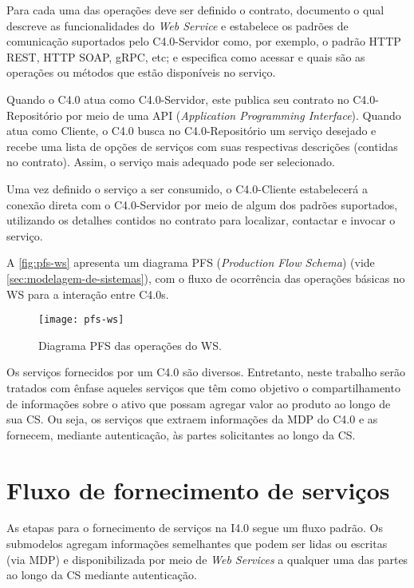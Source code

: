 Para cada uma das operações deve ser definido o contrato, documento o qual descreve as funcionalidades do \textit{Web Service} e estabelece os padrões de comunicação suportados pelo C4.0-Servidor como, por exemplo, o padrão HTTP REST, HTTP SOAP, gRPC, etc; e especifica como acessar e quais são as operações ou métodos que estão disponíveis no serviço.

Quando o C4.0 atua como C4.0-Servidor, este publica seu contrato no C4.0-Repositório por meio de uma API (\textit{Application Programming Interface}). Quando atua como Cliente, o C4.0 busca no C4.0-Repositório um serviço desejado e recebe uma lista de opções de serviços com suas respectivas descrições (contidas no contrato). Assim, o serviço mais adequado pode ser selecionado.

Uma vez definido o serviço a ser consumido, o C4.0-Cliente estabelecerá a conexão direta com o C4.0-Servidor por meio de algum dos padrões suportados, utilizando os detalhes contidos no contrato para localizar, contactar e invocar o serviço.

A \autoref{fig:pfs-ws} apresenta um diagrama PFS (\textit{Production Flow Schema}) (vide \autoref{sec:modelagem-de-sistemas}), com o fluxo de ocorrência das operações básicas no WS para a interação entre C4.0s.

\begin{figure}[t]
	\centering
	\texttt{[image: pfs-ws]}
	\caption{Diagrama PFS das operações do WS.}
	\label{fig:pfs-ws}
\end{figure}

Os serviços fornecidos por um C4.0 são diversos. Entretanto, neste trabalho serão tratados com ênfase aqueles serviços que têm como objetivo o compartilhamento de informações sobre o ativo que possam agregar valor ao produto ao longo de sua CS. Ou seja, os serviços que extraem informações da MDP do C4.0 e as fornecem, mediante autenticação, às partes solicitantes ao longo da CS.

\section{Fluxo de fornecimento de serviços}
\label{sec:fluxo-de-fornecimento-de-servicos}

As etapas para o fornecimento de serviços na I4.0 segue um fluxo padrão. Os submodelos agregam informações semelhantes que podem ser lidas ou escritas (via MDP) e disponibilizada por meio de \textit{Web Services} a qualquer uma das partes ao longo da CS mediante autenticação.

